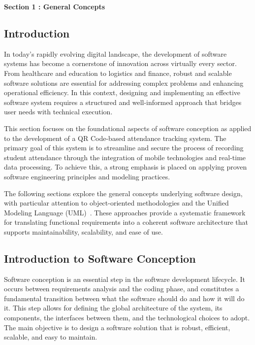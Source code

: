 \documentclass[12pt,a4paper]{report}
\begin{document}
\newpage
\vspace{0.3cm}

\begin{tcolorbox}[
    colback=mintgreen!20, 
    colframe=mintgreen!80!black, 
    width=\textwidth, 
    boxrule=1pt, 
    arc=5pt, 
    auto outer arc,
    left=10pt,
    right=10pt,
    top=6pt,
    bottom=6pt
]
    \centering
    \Large \textbf{Section 1 : General Concepts} %
\end{tcolorbox}

{}

\subsection{Introduction}
In today's rapidly evolving digital landscape, the development of software systems has become a cornerstone of innovation across virtually every sector. From healthcare and education to logistics and finance, robust and scalable software solutions are essential for addressing complex problems and enhancing operational efficiency. In this context, designing and implementing an effective software system requires a structured and well-informed approach that bridges user needs with technical execution.

This section focuses on the foundational aspects of software conception as applied to the development of a QR Code-based attendance tracking system. The primary goal of this system is to streamline and secure the process of recording student attendance through the integration of mobile technologies and real-time data processing. To achieve this, a strong emphasis is placed on applying proven software engineering principles and modeling practices.

The following sections explore the general concepts underlying software design, with particular attention to object-oriented methodologies and the Unified Modeling Language (UML)~\cite{omg2017}. These approaches provide a systematic framework for translating functional requirements into a coherent software architecture that supports maintainability, scalability, and ease of use.


\subsection{Introduction to Software Conception}
Software conception is an essential step in the software development lifecycle. It occurs between requirements analysis and the coding phase, and constitutes a fundamental transition between what the software should do and how it will do it. This step allows for defining the global architecture of the system, its components, the interfaces between them, and the technological choices to adopt. The main objective is to design a software solution that is robust, efficient, scalable, and easy to maintain.
\end{document}
